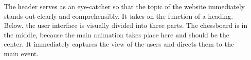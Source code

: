 The header serves as an eye-catcher so that the topic of the website immediately stands out clearly and comprehensibly. It takes on the function of a heading. 
\\
Below, the user interface is visually divided into three parts. The chessboard is in the middle, because the main animation takes place here and should be the center. It immediately captures the view of the users and directs them to the main event. 
